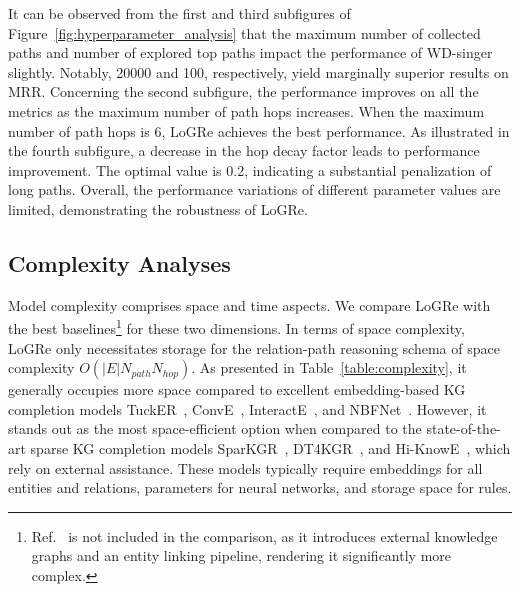 \documentclass[sigconf]{acmart}
\begin{document}
It can be observed from the first and third subfigures of Figure~\ref{fig:hyperparameter_analysis} that the maximum number of collected paths and number of explored top paths impact the performance of WD-singer slightly. Notably, 20000 and 100, respectively, yield marginally superior results on MRR. Concerning the second subfigure, the performance improves on all the metrics as the maximum number of path hops increases. When the maximum number of path hops is 6, LoGRe achieves the best performance. As illustrated in the fourth subfigure, a decrease in the hop decay factor leads to performance improvement. The optimal value is 0.2, indicating a substantial penalization of long paths. Overall, the performance variations of different parameter values are limited, demonstrating the robustness of LoGRe.

\subsection{Complexity Analyses} 
Model complexity comprises space and time aspects. We compare LoGRe with the best baselines\footnote{Ref.~\cite{SKG2023-Application} is not included in the comparison, as it introduces external knowledge graphs and an entity linking pipeline, rendering it significantly more complex.} for these two dimensions. In terms of space complexity, LoGRe only necessitates storage for the relation-path reasoning schema of space complexity $O(|E| N_{path} N_{hop})$. As presented in Table~\ref{table:complexity}, it generally occupies more space compared to excellent embedding-based KG completion models TuckER~\cite{TuckER}, ConvE~\cite{ConvE}, InteractE~\cite{InteractE}, and NBFNet~\cite{NBFNet}. However, it stands out as the most space-efficient option when compared to the state-of-the-art sparse KG completion models SparKGR~\cite{SparKGR}, DT4KGR~\cite{DT4KGR}, and Hi-KnowE~\cite{Hi-KnowE}, which rely on external assistance. These models typically require embeddings for all entities and relations, parameters for neural networks, and storage space for rules.
\end{document}
